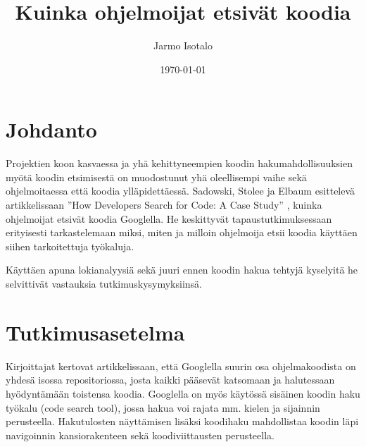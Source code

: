 \documentclass[finnish]{../tktltiki2}
\title{Kuinka ohjelmoijat etsivät koodia}
\author{Jarmo Isotalo}
\date{\today}
\theoremstyle{definition}
\theoremstyle{remark}
\begin{document}

\frontmatter      %

\maketitle        %

\tableofcontents  %


\mainmatter       %

\section{Johdanto}

Projektien koon kasvaessa ja yhä kehittyneempien koodin hakumahdollisuuksien myötä koodin etsimisestä on muodostunut yhä oleellisempi vaihe sekä ohjelmoitaessa että koodia ylläpidettäessä. Sadowski, Stolee ja Elbaum esittelevä artikkelissaan ''How Developers Search for Code: A Case Study'' \cite{g_search_code}, kuinka ohjelmoijat etsivät koodia Googlella.
He keskittyvät tapaustutkimuksessaan erityisesti tarkastelemaan miksi, miten ja milloin ohjelmoija etsii koodia käyttäen siihen tarkoitettuja työkaluja.

Käyttäen apuna lokianalyysiä sekä juuri ennen koodin hakua tehtyjä kyselyitä he selvittivät vastauksia tutkimuskysymyksiinsä.

\section{Tutkimusasetelma}

Kirjoittajat kertovat artikkelissaan, että Googlella suurin osa ohjelmakoodista on yhdesä isossa repositoriossa, josta kaikki pääsevät katsomaan ja halutessaan hyödyntämään toistensa koodia. Googlella on myös käytössä sisäinen koodin haku työkalu (code search tool), jossa hakua voi rajata mm. kielen ja sijainnin perusteella. Hakutulosten näyttämisen lisäksi koodihaku mahdollistaa koodin läpi navigoinnin kansiorakenteen sekä koodiviittausten perusteella. %
\end{document}
